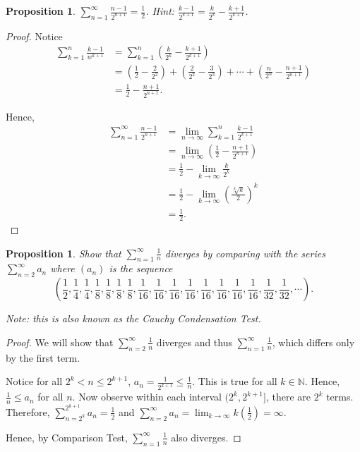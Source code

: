 \documentclass{article}
\newtheorem{proposition}[thm]{Proposition}
\begin{document}
\begin{proposition}
    $\sum_{n=1}^{\infty}\frac{n-1}{2^{n+1}}=\frac{1}{2}$. 
    Hint: $\frac{k-1}{2^{k+1}}=\frac{k}{2^k}-\frac{k+1}{2^{k+1}}$.
\end{proposition}
\begin{proof}
    Notice 
    \begin{align*}
        \sum_{k=1}^{n}\frac{k-1}{w^{k+1}} & = 
        \sum_{k=1}^{n}\left(\frac{k}{2^k}-\frac{k+1}{2^{k+1}}\right) \\
        & = \left(\frac{1}{2}-\frac{2}{2^2}\right) + \left(\frac{2}{2^2}-\frac{3}{2^3}\right) 
        + \cdots + \left(\frac{n}{2^n}-\frac{n+1}{2^{n+1}}\right) \\
        & = \frac{1}{2} - \frac{n+1}{2^{n+1}}.
    \end{align*}

    Hence, 
    \begin{align*}
        \sum_{n=1}^{\infty}\frac{n-1}{2^{n+1}} & = \lim_{n\to\infty}\sum_{k=1}^{n}\frac{k-1}{2^{k+1}} \\
        & = \lim_{n\to\infty}\left(\frac{1}{2} - \frac{n+1}{2^{n+1}}\right) \\
        & = \frac{1}{2} - \lim_{k\to\infty}\frac{k}{2^k} \\
        & = \frac{1}{2} - \lim_{k\to\infty}\left(\frac{\sqrt[k]{k}}{2}\right)^k \\
        & = \frac{1}{2}.
    \end{align*}
\end{proof}

\begin{proposition}
    Show that $\sum_{n=1}^{\infty}\frac{1}{n}$ diverges by comparing with the series 
    $\sum_{n=2}^{\infty}a_n$ where $(a_n)$ is the sequence 
    $$(\frac{1}{2},\frac{1}{4},\frac{1}{4},\frac{1}{8},\frac{1}{8},\frac{1}{8},\frac{1}{8}
    ,\frac{1}{16},\frac{1}{16},\frac{1}{16},\frac{1}{16},\frac{1}{16},\frac{1}{16},\frac{1}{16}
    ,\frac{1}{16},\frac{1}{32},\frac{1}{32}, \cdots).$$
    
    Note: this is also known as the Cauchy Condensation Test.
\end{proposition}
\begin{proof}
    We will show that $\sum_{n=2}^{\infty}\frac{1}{n}$ diverges and thus 
    $\sum_{n=1}^{\infty}\frac{1}{n}$, which differs only by the first term.

    Notice for all $2^k< n\le2^{k+1}$, $a_n = \frac{1}{2^{k+1}}\le\frac{1}{n}$. This is true for 
    all $k\in\mathbb{N}$. Hence, $\frac{1}{n}\le a_n$ for all $n$. Now observe within each interval 
    $(2^k,2^{k+1}]$, there are $2^k$ terms. Therefore, $\sum_{n=2^k}^{2^{k+1}}a_n=\frac{1}{2}$ and 
    $\sum_{n=2}^{\infty}a_n = \lim_{k\to\infty}k\left(\frac{1}{2}\right)=\infty$. 

    Hence, by Comparison Test, $\sum_{n=1}^{\infty}\frac{1}{n}$ also diverges.
\end{proof}
\end{document}

